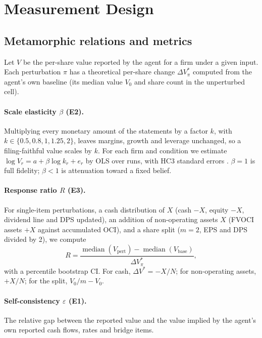 \documentclass[11pt]{article}
\begin{document}
\section{Measurement Design}

\subsection{Metamorphic relations and metrics}

Let $V$ be the per-share value reported by the agent for a firm under a given input. Each perturbation $\pi$ has a theoretical per-share change $\Delta V^*_\pi$ computed from the agent's own baseline (its median value $V_0$ and share count in the unperturbed cell).

\paragraph{Scale elasticity $\beta$ (E2).} Multiplying every monetary amount of the statements by a factor $k$, with $k \in \{0.5, 0.8, 1, 1.25, 2\}$, leaves margins, growth and leverage unchanged, so a filing-faithful value scales by $k$. For each firm and condition we estimate $\log V_{r} = a + \beta \log k_r + e_r$ by OLS over runs, with HC3 standard errors \citep{mackinnon1985some}. $\beta=1$ is full fidelity; $\beta<1$ is attenuation toward a fixed belief.

\paragraph{Response ratio $R$ (E3).} For single-item perturbations, a cash distribution of $X$ (cash $-X$, equity $-X$, dividend line and DPS updated), an addition of non-operating assets $X$ (FVOCI assets $+X$ against accumulated OCI), and a share split ($m=2$, EPS and DPS divided by 2), we compute
\[ R = \frac{\operatorname{median}(V_{\text{pert}}) - \operatorname{median}(V_{\text{base}})}{\Delta V^*_\pi}, \]
with a percentile bootstrap CI. For cash, $\Delta V^* = -X/N$; for non-operating assets, $+X/N$; for the split, $V_0/m - V_0$.

\paragraph{Self-consistency $\varepsilon$ (E1).} The relative gap between the reported value and the value implied by the agent's own reported cash flows, rates and bridge items.
\end{document}
